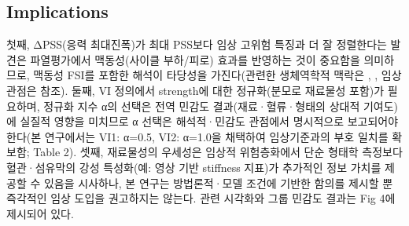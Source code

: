 \documentclass[preprint,12pt]{elsarticle}
\begin{document}
\subsection{Implications}
첫째, ΔPSS(응력 최대진폭)가 최대 PSS보다 임상 고위험 특징과 더 잘 정렬한다는 발견은 파열평가에서 맥동성(사이클 부하/피로) 효과를 반영하는 것이 중요함을 의미하므로, 맥동성 FSI를 포함한 해석이 타당성을 가진다(관련한 생체역학적 맥락은 \cite{brown2016}, \cite{choi2015}, 임상 관점은 \cite{stefanadis2017} 참조). 둘째, VI 정의에서 strength에 대한 정규화(분모로 재료물성 포함)가 필요하며, 정규화 지수 α의 선택은 전역 민감도 결과(재료·혈류·형태의 상대적 기여도)에 실질적 영향을 미치므로 α 선택은 해석적·민감도 관점에서 명시적으로 보고되어야 한다(본 연구에서는 VI1: α=0.5, VI2: α=1.0을 채택하여 임상기준과의 부호 일치를 확보함; Table 2). 셋째, 재료물성의 우세성은 임상적 위험층화에서 단순 형태학 측정보다 혈관·섬유막의 강성 특성화(예: 영상 기반 stiffness 지표)가 추가적인 정보 가치를 제공할 수 있음을 시사하나, 본 연구는 방법론적·모델 조건에 기반한 함의를 제시할 뿐 즉각적인 임상 도입을 권고하지는 않는다. 관련 시각화와 그룹 민감도 결과는 Fig 4에 제시되어 있다.
\end{document}
